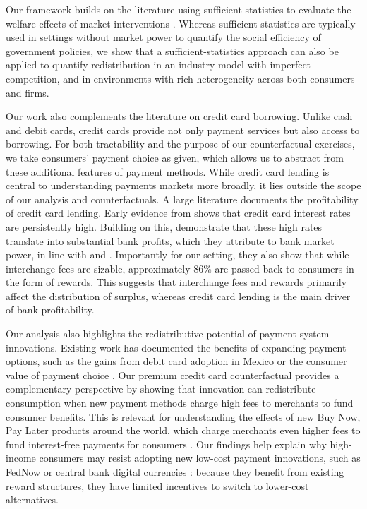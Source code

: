 \documentclass[main.tex]{subfiles}
\begin{document}
Our framework builds on the literature using sufficient statistics to evaluate the welfare effects of market interventions \citep{Chetty2009, Kleven2021}.
Whereas sufficient statistics are typically used in settings without market power to quantify the social efficiency of government policies, we show that a sufficient-statistics approach can also be applied to quantify redistribution in an industry model with imperfect competition, and in environments with rich heterogeneity across both consumers and firms.

Our work also complements the literature on credit card borrowing. Unlike cash and debit cards, credit cards provide not only payment services but also access to borrowing. For both tractability and the purpose of our counterfactual exercises, we take consumers' payment choice as given, which allows us to abstract from these additional features of payment methods. While credit card lending is central to understanding payments markets more broadly, it lies outside the scope of our analysis and counterfactuals.
A large literature documents the profitability of credit card lending. Early evidence from \citet{ausubel1991failure} shows that credit card interest rates are persistently high. Building on this, \citet{Drechsler.etal2025} demonstrate that these high rates translate into substantial bank profits, which they attribute to bank market power, in line with \citet{drechsler2017deposits} and \citet{drechsler2021banking}. 
Importantly for our setting, they also show that while interchange fees are sizable, approximately 86\% are passed back to consumers in the form of rewards. This suggests that interchange fees and rewards primarily affect the distribution of surplus, whereas credit card lending is the main driver of bank profitability.

Our analysis also highlights the redistributive potential of payment system innovations.
Existing work has documented the benefits of expanding payment options, such as the gains from debit card adoption in Mexico \citep{Higgins2024} or the consumer value of payment choice \citep{Alvarez.Argente2025}.
Our premium credit card counterfactual provides a complementary perspective by showing that innovation can redistribute consumption when new payment methods charge high fees to merchants to fund consumer benefits.
This is relevant for understanding the effects of new Buy Now, Pay Later products around the world, which charge merchants even higher fees to fund interest-free payments for consumers \citep{Berg.etal2024}.
Our findings help explain why high-income consumers may resist adopting new low-cost payment innovations, such as FedNow or central bank digital currencies \citep{whited2022will}: because they benefit from existing reward structures, they have limited incentives to switch to lower-cost alternatives.
\end{document}

